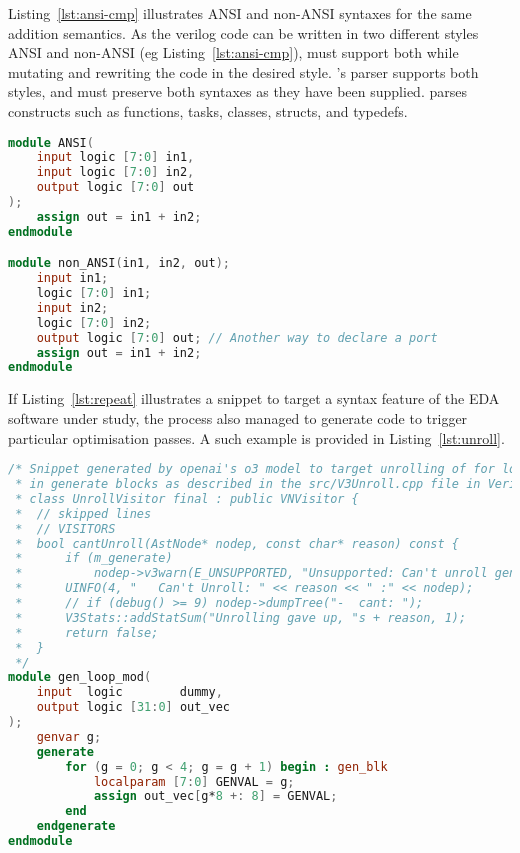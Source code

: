 Listing~\ref{lst:ansi-cmp} illustrates ANSI and non-ANSI syntaxes for the same addition semantics.
As the verilog code can be written in two different
styles ANSI and non-ANSI (eg Listing~\ref{lst:ansi-cmp}), \ourname must support both while mutating and rewriting the code in the desired style.
\ourname's parser supports both styles, and must preserve both syntaxes as they have been supplied.
\ourname parses constructs such as functions, tasks, classes, structs, and typedefs.

\begin{lstlisting}[language=verilog,caption={ANSI and non-ANSI styles},label={lst:ansi-cmp},breaklines=true]
module ANSI(
    input logic [7:0] in1,
    input logic [7:0] in2,
    output logic [7:0] out
);
    assign out = in1 + in2;
endmodule

module non_ANSI(in1, in2, out);
    input in1;
    logic [7:0] in1;
    input in2;
    logic [7:0] in2;
    output logic [7:0] out; // Another way to declare a port
    assign out = in1 + in2;
endmodule
\end{lstlisting}


If Listing~\ref{lst:repeat} illustrates a snippet to target a syntax feature of the EDA software under study,
the process also managed to generate code to trigger particular optimisation passes.
A such example is provided in Listing~\ref{lst:unroll}.

\begin{lstlisting}[caption={Example of a snippet generated to target Verilator's optimisation of for loops.},label={lst:unroll},language=verilog,breaklines=true]
/* Snippet generated by openai's o3 model to target unrolling of for loops wrapped
 * in generate blocks as described in the src/V3Unroll.cpp file in Verilator's source code 
 * class UnrollVisitor final : public VNVisitor {
 *  // skipped lines
 *  // VISITORS
 *  bool cantUnroll(AstNode* nodep, const char* reason) const {
 *      if (m_generate)
 *          nodep->v3warn(E_UNSUPPORTED, "Unsupported: Can't unroll generate for; " << reason);
 *      UINFO(4, "   Can't Unroll: " << reason << " :" << nodep);
 *      // if (debug() >= 9) nodep->dumpTree("-  cant: ");
 *      V3Stats::addStatSum("Unrolling gave up, "s + reason, 1);
 *      return false;
 *  }
 */
module gen_loop_mod(
    input  logic        dummy,
    output logic [31:0] out_vec
);
    genvar g;
    generate
        for (g = 0; g < 4; g = g + 1) begin : gen_blk
            localparam [7:0] GENVAL = g;
            assign out_vec[g*8 +: 8] = GENVAL;
        end
    endgenerate
endmodule
\end{lstlisting}
